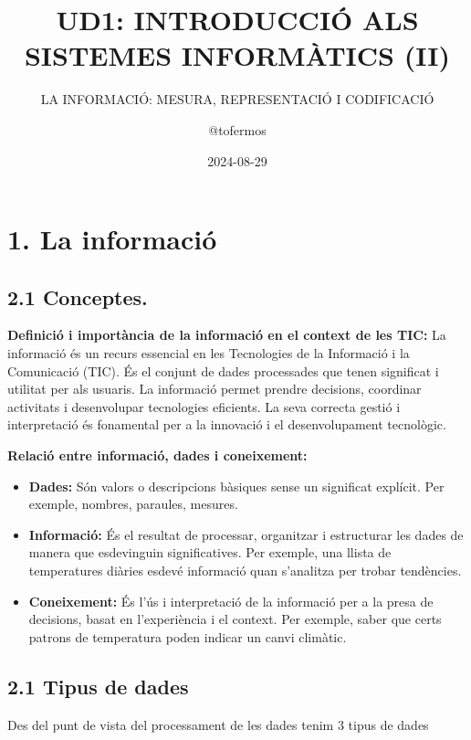 \documentclass[
  12 pt,
  a4paper,
]{article}
\title{UD1: INTRODUCCIÓ ALS SISTEMES INFORMÀTICS (II)}
\subtitle{LA INFORMACIÓ: MESURA, REPRESENTACIÓ I CODIFICACIÓ}
\author{@tofermos}
\date{2024-08-29}
\begin{document}
\maketitle

{
\setcounter{tocdepth}{2}
\tableofcontents
}
\section{1. La informació}\label{la-informaciuxf3}

\subsection{2.1 Conceptes.}\label{conceptes.}

\textbf{Definició i importància de la informació en el context de les
TIC:} La informació és un recurs essencial en les Tecnologies de la
Informació i la Comunicació (TIC). És el conjunt de dades processades
que tenen significat i utilitat per als usuaris. La informació permet
prendre decisions, coordinar activitats i desenvolupar tecnologies
eficients. La seva correcta gestió i interpretació és fonamental per a
la innovació i el desenvolupament tecnològic.

\textbf{Relació entre informació, dades i coneixement:}

\begin{itemize}
\item
  \textbf{Dades:} Són valors o descripcions bàsiques sense un significat
  explícit. Per exemple, nombres, paraules, mesures.
\item
  \textbf{Informació:} És el resultat de processar, organitzar i
  estructurar les dades de manera que esdevinguin significatives. Per
  exemple, una llista de temperatures diàries esdevé informació quan
  s'analitza per trobar tendències.
\item
  \textbf{Coneixement:} És l'ús i interpretació de la informació per a
  la presa de decisions, basat en l'experiència i el context. Per
  exemple, saber que certs patrons de temperatura poden indicar un canvi
  climàtic.
\end{itemize}

\subsection{2.1 Tipus de dades}\label{tipus-de-dades}

Des del punt de vista del processament de les dades tenim 3 tipus de
dades
\end{document}
